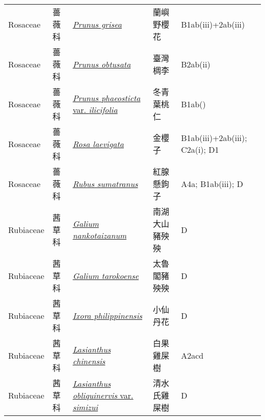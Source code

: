 {\begin{longtable}{p{2.5cm}p{2.5cm}p{4.5cm}p{2.5cm}p{3cm}}
    Rosaceae & 薔薇科 & \href{http://www.theplantlist.org/tpl1.1/search?q=Prunus+grisea}{\textit{Prunus grisea} } & 蘭嶼野櫻花 & B1ab(iii)+2ab(iii) \index{Prunus@\textit{Prunus}!grisea@\textit{grisea}}  \index{蘭嶼野櫻花} \\
    Rosaceae & 薔薇科 & \href{http://www.theplantlist.org/tpl1.1/search?q=Prunus+obtusata}{\textit{Prunus obtusata} } & 臺灣椆李 & B2ab(ii) \index{Prunus@\textit{Prunus}!obtusata@\textit{obtusata}}  \index{臺灣椆李} \\
    Rosaceae & 薔薇科 & \href{http://www.theplantlist.org/tpl1.1/search?q=Prunus+phaeosticta+var.+ilicifolia}{\textit{Prunus phaeosticta} var. \textit{ilicifolia} } & 冬青葉桃仁 & B1ab() \index{Prunus@\textit{Prunus}!phaeosticta@\textit{phaeosticta}!var. ilicifolia@var. \textit{ilicifolia}}  \index{冬青葉桃仁} \\
    Rosaceae & 薔薇科 & \href{http://www.theplantlist.org/tpl1.1/search?q=Rosa+laevigata}{\textit{Rosa laevigata} } & 金櫻子 & B1ab(iii)+2ab(iii); C2a(i); D1 \index{Rosa@\textit{Rosa}!laevigata@\textit{laevigata}}  \index{金櫻子} \\
    Rosaceae & 薔薇科 & \href{http://www.theplantlist.org/tpl1.1/search?q=Rubus+sumatranus}{\textit{Rubus sumatranus} } & 紅腺懸鉤子 & A4a; B1ab(iii); D \index{Rubus@\textit{Rubus}!sumatranus@\textit{sumatranus}}  \index{紅腺懸鉤子} \\
    Rubiaceae & 茜草科 & \href{http://www.theplantlist.org/tpl1.1/search?q=Galium+nankotaizanum}{\textit{Galium nankotaizanum} } & 南湖大山豬殃殃 & D \index{Galium@\textit{Galium}!nankotaizanum@\textit{nankotaizanum}}  \index{南湖大山豬殃殃} \\
    Rubiaceae & 茜草科 & \href{http://www.theplantlist.org/tpl1.1/search?q=Galium+tarokoense}{\textit{Galium tarokoense} } & 太魯閣豬殃殃 & D \index{Galium@\textit{Galium}!tarokoense@\textit{tarokoense}}  \index{太魯閣豬殃殃} \\
    Rubiaceae & 茜草科 & \href{http://www.theplantlist.org/tpl1.1/search?q=Ixora+philippinensis}{\textit{Ixora philippinensis} } & 小仙丹花 & D \index{Ixora@\textit{Ixora}!philippinensis@\textit{philippinensis}}  \index{小仙丹花} \\
    Rubiaceae & 茜草科 & \href{http://www.theplantlist.org/tpl1.1/search?q=Lasianthus+chinensis}{\textit{Lasianthus chinensis} } & 白果雞屎樹 & A2acd \index{Lasianthus@\textit{Lasianthus}!chinensis@\textit{chinensis}}  \index{白果雞屎樹} \\
    Rubiaceae & 茜草科 & \href{http://www.theplantlist.org/tpl1.1/search?q=Lasianthus+obliquinervis+var.+simizui}{\textit{Lasianthus obliquinervis} var. \textit{simizui} } & 清水氏雞屎樹 & D \index{Lasianthus@\textit{Lasianthus}!obliquinervis@\textit{obliquinervis}!var. simizui@var. \textit{simizui}}  \index{清水氏雞屎樹} \\

\end{longtable}}
